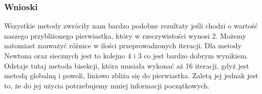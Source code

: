 \documentclass{article}
\begin{document}
\subsubsection*{Wnioski}
	Wszystkie metody zwróciły nam bardzo podobne rezultaty jeśli chodzi o wartość naszego przybliżonego pierwiastka, który w rzeczywistości wynosi 2. Możemy natomiast zauważyć różnice w ilości przeprowadzonych iteracji. Dla metody Newtona oraz siecznych jest to kolejno 4 i 3 co jest bardzo dobrym wynikiem. Odstaje tutaj metoda bisekcji, która musiała wykonać aż 16 iteracji, gdyż jest metodą globalną i powoli, liniowo zbliża się do pierwiastka. Zaletą jej jednak jest to, że do jej użycia potrzebujemy mniej informacji początkowych.
\end{document}
